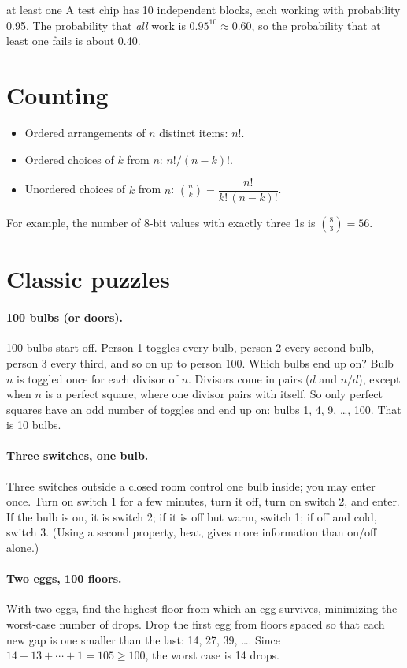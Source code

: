 \begin{worked}{at least one}
A test chip has 10 independent blocks, each working with probability 0.95. The probability that \emph{all} work is $0.95^{10} \approx 0.60$, so the probability that at least one fails is about 0.40.
\end{worked}

\section{Counting}

\begin{itemize}
  \item Ordered arrangements of $n$ distinct items: $n!$.
  \item Ordered choices of $k$ from $n$: $n!/(n-k)!$.
  \item Unordered choices of $k$ from $n$: $\binom{n}{k} = \dfrac{n!}{k!\,(n-k)!}$.
\end{itemize}
For example, the number of 8-bit values with exactly three 1s is $\binom{8}{3} = 56$.

\section{Classic puzzles}

\paragraph{100 bulbs (or doors).} 100 bulbs start off. Person 1 toggles every bulb, person 2 every second bulb, person 3 every third, and so on up to person 100. Which bulbs end up on? Bulb $n$ is toggled once for each divisor of $n$. Divisors come in pairs ($d$ and $n/d$), except when $n$ is a perfect square, where one divisor pairs with itself. So only perfect squares have an odd number of toggles and end up on: bulbs 1, 4, 9, \ldots, 100. That is 10 bulbs.

\paragraph{Three switches, one bulb.} Three switches outside a closed room control one bulb inside; you may enter once. Turn on switch 1 for a few minutes, turn it off, turn on switch 2, and enter. If the bulb is on, it is switch 2; if it is off but warm, switch 1; if off and cold, switch 3. (Using a second property, heat, gives more information than on/off alone.)

\paragraph{Two eggs, 100 floors.} With two eggs, find the highest floor from which an egg survives, minimizing the worst-case number of drops. Drop the first egg from floors spaced so that each new gap is one smaller than the last: 14, 27, 39, \ldots. Since $14 + 13 + \cdots + 1 = 105 \ge 100$, the worst case is 14 drops.

